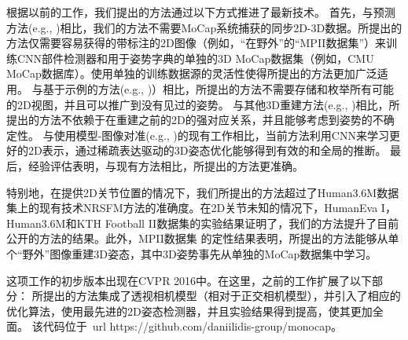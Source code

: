 根据以前的工作，我们提出的方法通过以下方式推进了最新技术。
首先，与预测方法(e.g., \cite{li2015,tekin2015})相比，我们的方法不需要MoCap系统捕获的同步2D-3D数据。所提出的方法仅需要容易获得的带标注的2D图像（例如，“在野外”的“MPII数据集”\cite{andriluka14cvpr}）来训练CNN部件检测器和用于姿势字典的单独的3D MoCap数据集（例如，CMU MoCap数据库）。使用单独的训练数据源的灵活性使得所提出的方法更加广泛适用。
与基于示例的方法(e.g., \cite{jiang20103d,yasin2016dual})）相比，所提出的方法不需要存储和枚举所有可能的2D视图，并且可以推广到没有见过的姿势。
与其他3D重建方法(e.g., \cite{jiang20103d,yasin2016dual})相比，所提出的方法不依赖于在重建之前的2D的强对应关系，并且能够考虑到姿势的不确定性。
与使用模型-图像对准(e.g., \cite{guan2009estimating,sigal2012loose,bogo2016keep})的现有工作相比，当前方法利用CNN来学习更好的2D表示，通过稀疏表达驱动的3D姿态优化能够得到有效的和全局的推断。
最后，经验评估表明，与现有方法相比，所提出的方法更准确。


特别地，在提供2D关节位置的情况下，我们所提出的方法超过了Human3.6M数据集\cite{ionescu2014human}上的现有技术NRSFM方法\cite{dai2012simple}的准确度。在2D关节未知的情况下，HumanEva I\cite{sigal2010humaneva}，Human3.6M\cite{ionescu2014human}和KTH Football II数据集\cite{kazemi2013multi}的实验结果证明了，我们的方法提升了目前公开的方法的结果。此外，MPII数据集 \cite{andriluka14cvpr} 的定性结果表明，所提出的方法能够从单个“野外”图像重建3D姿态，其中3D姿势事先从单独的MoCap数据集中学习。

这项工作的初步版本出现在CVPR 2016\cite{zhou2016sparseness}中。在这里，之前的工作扩展了以下部分：
所提出的方法集成了透视相机模型（相对于正交相机模型），并引入了相应的优化算法，使用最先进的2D姿态检测器，并且实验结果得到提高，使其更加全面。
该代码位于\ url {https://github.com/daniilidis-group/monocap}。


